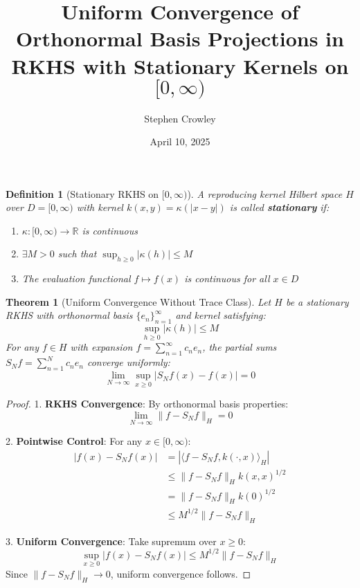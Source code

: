 \documentclass{article}
\title{Uniform Convergence of Orthonormal Basis Projections in RKHS with Stationary Kernels on $[0,\infty)$}
\author{Stephen Crowley}
\date{April 10, 2025}
\newtheorem{definition}{Definition}
\newtheorem{theorem}{Theorem}
\begin{document}
\maketitle

\begin{definition}[Stationary RKHS on $[0,\infty)$]
A reproducing kernel Hilbert space $H$ over $D = [0,\infty)$ with kernel $k(x,y) = \kappa(|x-y|)$ is called \textbf{stationary} if:
\begin{enumerate}
    \item $\kappa: [0,\infty) \to \mathbb{R}$ is continuous
    \item $\exists M > 0$ such that $\sup_{h \geq 0} |\kappa(h)| \leq M$
    \item The evaluation functional $f \mapsto f(x)$ is continuous for all $x \in D$
\end{enumerate}
\end{definition}

\begin{theorem}[Uniform Convergence Without Trace Class]\label{thm:main}
Let $H$ be a stationary RKHS with orthonormal basis $\{e_n\}_{n=1}^\infty$ and kernel satisfying:
\begin{equation}
    \sup_{h \geq 0} |\kappa(h)| \leq M
\end{equation}
For any $f \in H$ with expansion $f = \sum_{n=1}^\infty c_ne_n$, the partial sums $S_Nf = \sum_{n=1}^N c_ne_n$ converge uniformly:
\begin{equation}
    \lim_{N\to\infty} \sup_{x\geq 0} |S_Nf(x) - f(x)| = 0
\end{equation}
\end{theorem}

\begin{proof}
1. \textbf{RKHS Convergence}: By orthonormal basis properties:
\begin{equation}
    \lim_{N\to\infty} \|f - S_Nf\|_H = 0
\end{equation}

2. \textbf{Pointwise Control}: For any $x \in [0,\infty)$:
\begin{align*}
|f(x) - S_Nf(x)| &= |\langle f - S_Nf, k(\cdot,x)\rangle_H| \\
&\leq \|f - S_Nf\|_H k(x,x)^{1/2} \\
&= \|f - S_Nf\|_H k(0)^{1/2} \\
&\leq M^{1/2} \|f - S_Nf\|_H
\end{align*}

3. \textbf{Uniform Convergence}: Take supremum over $x \geq 0$:
\begin{equation}
    \sup_{x\geq 0} |f(x) - S_Nf(x)| \leq M^{1/2} \|f - S_Nf\|_H
\end{equation}
Since $\|f - S_Nf\|_H \to 0$, uniform convergence follows.
\end{proof}
\end{document}
